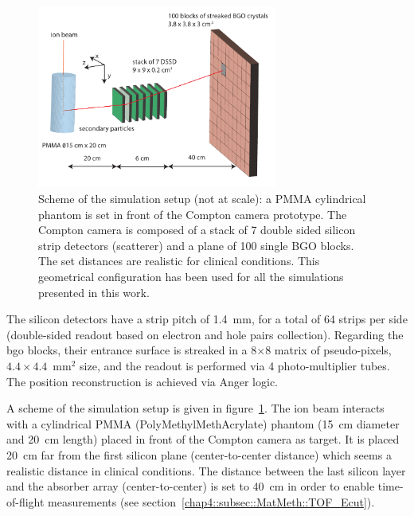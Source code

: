 \begin{figure}	
  \centering
  \includegraphics[width=0.7\textwidth]{03_GraphicFiles/chapter4_HTsimu/Compton_Camera_hadontherapy_PMMA_Cylinder_EN.pdf}
  \caption{Scheme of the simulation setup (not at scale): a PMMA cylindrical phantom is set in front of the Compton camera prototype. The Compton camera is composed of a stack of 7 double sided silicon strip detectors (scatterer) and a plane of 100 single BGO blocks. The set distances are realistic for clinical conditions. This geometrical configuration has been used for all the simulations presented in this work.}
  \label{chap4::fig::fig_setup_CC_simulation_Hadronth}
\end{figure}

The silicon detectors have a strip pitch of 1.4~mm, for a total of 64 strips per side (double-sided readout based on electron and hole pairs collection). 
Regarding the \gls{bgo} blocks, their entrance surface is streaked in a 8$\times$8 matrix of pseudo-pixels, $4.4\times4.4$~mm$^{2}$ size, and the readout is performed via 4 photo-multiplier tubes. The position reconstruction is achieved via Anger logic.

A scheme of the simulation setup is given in figure~\ref{chap4::fig::fig_setup_CC_simulation_Hadronth}. The ion beam interacts with a cylindrical PMMA (PolyMethylMethAcrylate) phantom (15~cm diameter and 20~cm length) placed in front of the Compton camera as target. It is placed 20~cm far from the first silicon plane (center-to-center distance) which seems a realistic distance in clinical conditions. The distance between the last silicon layer and the absorber array (center-to-center) is set to 40~cm in order to enable time-of-flight measurements (see section~\ref{chap4::subsec::MatMeth::TOF_Ecut}).

